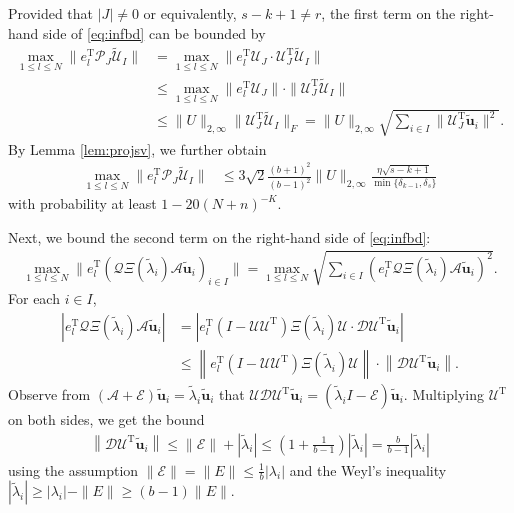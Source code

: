 \documentclass[reqno]{amsart}
\newcommand{\T}{\mathrm{T}}
\theoremstyle{plain}
\theoremstyle{definition}
\begin{document}
Provided that $|J|\neq 0$ or equivalently, $s-k+1\neq r $, the first term on the right-hand side of \eqref{eq:infbd} can be bounded by
\begin{align*}
\max_{1\le l \le N} \|e_l^\T \mathcal P_J \widetilde{\mathcal U}_I\| &= \max_{1\le l \le N} \|e_l^\T \mathcal U_J \cdot \mathcal U_J^\T \widetilde{\mathcal U}_I\|\\
&\le \max_{1\le l \le N} \|e_l^\T \mathcal U_J\| \cdot \| \mathcal U_J^\T \widetilde{\mathcal U}_I\|  \\
&\le \| U\|_{2,\infty}  \| \mathcal U_J^\T \widetilde{\mathcal U}_I\|_F = \| U\|_{2,\infty}  \sqrt{\sum_{i\in I} \| \mathcal U_J^\T \widetilde{\mathbf u}_i \|^2}.
\end{align*}
By Lemma \ref{lem:projsv}, we further obtain 
\begin{align}\label{eq:1stbd}
\max_{1\le l \le N} \|e_l^\T \mathcal P_J \widetilde{\mathcal U}_I\| &\le  3\sqrt{2}\frac{(b+1)^2}{(b-1)^2}  \| U\|_{2,\infty} \frac{\eta\sqrt{s-k+1}}{\min\{\delta_{k-1}, \delta_s\}}
\end{align}
with probability at least $1-20(N+n)^{-K}$.

Next, we bound the second term on the right-hand side of \eqref{eq:infbd}: 
\begin{align}\label{eq:2ndbd}
\max_{1\le l \le N} \|e_l^\T (\mathcal Q \Xi(\widetilde \lambda_i) \mathcal A \widetilde{\mathbf u}_i)_{i\in I}\|=\max_{1\le l \le N} \sqrt{\sum_{i\in I}  (e_l^\T \mathcal Q \Xi(\widetilde \lambda_i) \mathcal A \widetilde{\mathbf u}_i)^2}.
\end{align}
For each $i \in I$, 
\begin{align}\label{eq:est1}
\left|e_l^\T \mathcal Q \Xi(\widetilde \lambda_i) \mathcal A \widetilde{\mathbf u}_i \right| &=  \left| e_l^\T (I-\mathcal U \mathcal U^\T) \Xi(\widetilde \lambda_i) \mathcal U \cdot \mathcal D \mathcal U^\T \widetilde{\mathbf u}_i \right|\nonumber\\
&\le  \left\| e_l^\T (I-\mathcal U \mathcal U^\T) \Xi(\widetilde \lambda_i) \mathcal U \right\| \cdot \left\| \mathcal D \mathcal U^\T \widetilde{\mathbf u}_i \right\|.
\end{align} 
Observe from $(\mathcal A + \mathcal E)  \widetilde{\mathbf u}_i =  \widetilde{\lambda}_i \widetilde{\mathbf u}_i$ that $\mathcal U \mathcal D \mathcal U^\T \widetilde{\mathbf u}_i=( \widetilde{\lambda}_i I -\mathcal E)\widetilde{\mathbf u}_i$. Multiplying $\mathcal U^\T$ on both sides, we get the bound 
\begin{align}\label{eq:bdonev01}
\left\|{\mathcal D} {\mathcal U}^\T \widetilde{\mathbf u}_i \right\| \le \|\mathcal E\|+|\widetilde{\lambda}_i| \le \left(1+\frac{1}{b-1} \right)|\widetilde{\lambda}_i| = \frac{b}{b-1}|\widetilde{\lambda}_i|
\end{align}
using the assumption $\|\mathcal E\|=\|E\| \le \frac{1}{b}|{\lambda}_i|$ and the Weyl's inequality $|\widetilde{\lambda}_i|\ge |{\lambda}_i| - \|E\| \ge (b-1)\|E\|$. 
\end{document}
